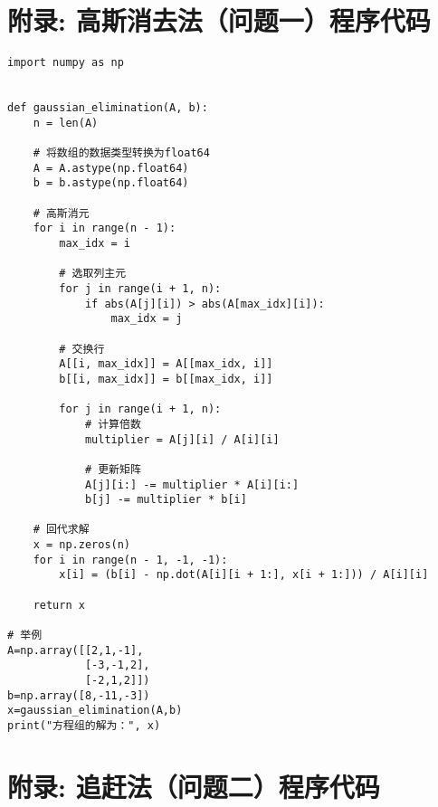 \documentclass[UTF8,ctexart,a4paper,11pt,openany]{article}
\theoremstyle{definition}
\begin{document}
\clearpage

\section{附录: 高斯消去法（问题一）程序代码}

\begin{lstlisting}[aboveskip=0pt]
import numpy as np


def gaussian_elimination(A, b):
    n = len(A)
    
    # 将数组的数据类型转换为float64
    A = A.astype(np.float64)
    b = b.astype(np.float64)
    
    # 高斯消元
    for i in range(n - 1):
        max_idx = i
    
        # 选取列主元
        for j in range(i + 1, n):
            if abs(A[j][i]) > abs(A[max_idx][i]):
                max_idx = j
    
        # 交换行
        A[[i, max_idx]] = A[[max_idx, i]]
        b[[i, max_idx]] = b[[max_idx, i]]
    
        for j in range(i + 1, n):
            # 计算倍数
            multiplier = A[j][i] / A[i][i]
    
            # 更新矩阵
            A[j][i:] -= multiplier * A[i][i:]
            b[j] -= multiplier * b[i]
    
    # 回代求解
    x = np.zeros(n)
    for i in range(n - 1, -1, -1):
        x[i] = (b[i] - np.dot(A[i][i + 1:], x[i + 1:])) / A[i][i]
    
    return x

# 举例
A=np.array([[2,1,-1],
            [-3,-1,2],
            [-2,1,2]])
b=np.array([8,-11,-3])
x=gaussian_elimination(A,b)
print("方程组的解为：", x)        
\end{lstlisting}

\clearpage



\section{附录: 追赶法（问题二）程序代码}
\end{document}
